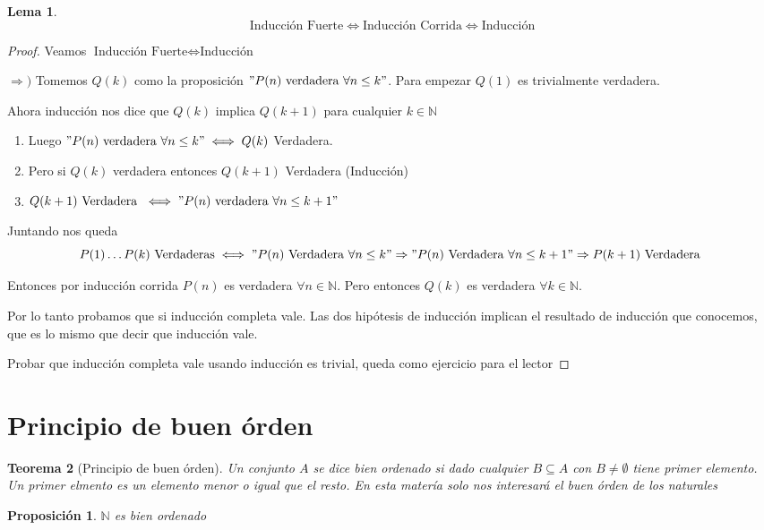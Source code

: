 \documentclass{article}
\theoremstyle{break}
\newtheorem{theorem}{Teorema}[section]
\newtheorem{lemma}[theorem]{Lema}
\newtheorem{proposition}{Proposición}
\def \N{\mathbb{N}}
\begin{document}
    
    \begin{lemma}
        $$ \text{Inducción Fuerte}\iff \text{Inducción Corrida} \iff \text{Inducción}$$
    \end{lemma}
    \begin{proof}
        Veamos $\text{Inducción Fuerte}\iff \text{Inducción}$

        $\Rightarrow )$ Tomemos $Q(k)$ como la proposición $"P(n) \text{ verdadera} \ \forall n \leq k"$. Para empezar $Q(1)$ es trivialmente verdadera.

        Ahora inducción nos dice que $Q(k)$ implica $Q(k+1)$ para cualquier $k \in\N$
        \begin{enumerate}
            \item Luego $" P(n) \text{ verdadera} \ \forall n \leq k " \iff Q(k)$ Verdadera.
            \item Pero si $Q(k)$ verdadera entonces $Q(k+1)$ Verdadera (Inducción)
            \item $Q(k+1) \text{ Verdadera } \iff "P(n) \text{ verdadera} \ \forall n \leq k+1"$ 
        \end{enumerate}

        Juntando nos queda $$P(1)\ldots P(k) \text{ Verdaderas} \iff "P(n) \text{ Verdadera} \ \forall n \leq k" \Rightarrow "P(n) \text{ Verdadera} \ \forall n \leq k+1" \Rightarrow P(k+1) \text{ Verdadera } $$ 

        Entonces por inducción corrida $P(n)$ es verdadera $\forall n \in \N$. Pero entonces 
        $Q(k)$ es verdadera $\forall k \in\N$.
        
        Por lo tanto probamos que si inducción completa vale.
        Las dos hipótesis de inducción implican el resultado de inducción que conocemos, que es lo mismo que decir que inducción vale.

        Probar que inducción completa vale usando inducción es trivial, queda como ejercicio para el lector 
        
    \end{proof}
    \newpage
    
    \section{Principio de buen órden}

    \begin{theorem}[Principio de buen órden]
        Un conjunto $A$ se dice bien ordenado si dado cualquier $B \subseteq A$ con $B\neq \emptyset$ tiene primer elemento.
    Un primer elmento es un elemento menor o igual que el resto. En esta matería solo nos interesará
    el buen órden de los naturales
    \end{theorem}
    \begin{proposition}
        $\N$ es bien ordenado
    \end{proposition}
\end{document}
